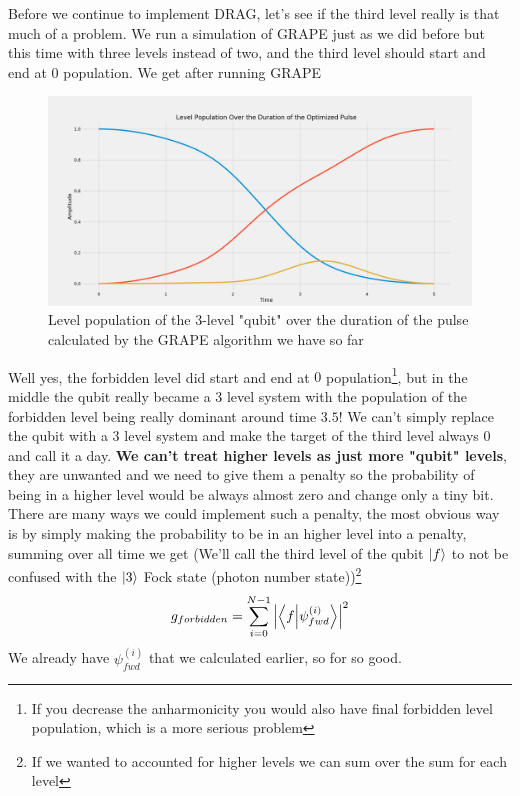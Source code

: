 Before we continue to implement DRAG, let's see if the third level really is that much of a problem. We run a simulation of GRAPE just as we did before but this time with three levels instead of two, and the third level should start and end at 0 population. We get after running GRAPE
\begin{figure}[H]
    \centering
    \includegraphics[width=1\columnwidth]{Results/Before-Drag/level-population-pretty.png}
    \caption{Level population of the 3-level "qubit" over the duration of the pulse calculated by the GRAPE algorithm we have so far}
    \label{fig:before-DRAG}
\end{figure}
Well yes, the forbidden level did start and end at $0$ population\footnote{If you decrease the anharmonicity you would also have final forbidden level population, which is a more serious problem}, but in the middle the qubit really became a 3 level system with the population of the forbidden level being really dominant around time $3.5$! We can't simply replace the qubit with a 3 level system and make the target of the third level always 0 and call it a day. \textbf{We can't treat higher levels as just more "qubit" levels}, they are unwanted and we need to give them a penalty so the probability of being in a higher level would be always almost zero and change only a tiny bit. There are many ways we could implement such a penalty, the most obvious way is by simply making the probability to be in an higher level into a penalty, summing over all time we get (We'll call the third level of the qubit $\ket{f}$ to not be confused with the $\ket{3}$ Fock state (photon number state))\footnote{If we wanted to accounted for higher levels we can sum over the sum for each level}
\[
    g_{forbidden} = \sum_{i=0}^{N - 1} \abs{\braket{f}{\psi_{fwd}^{ (i)}}}^2 
\]
We already have $\psi_{fwd}^{ (i)}$ that we calculated earlier, so for so good.

